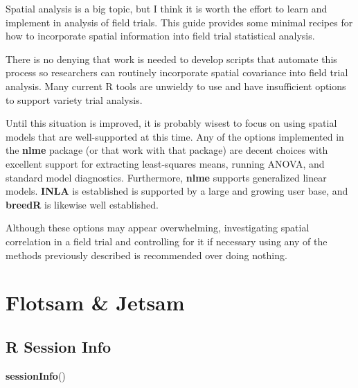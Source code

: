 \documentclass[
]{book}
\newenvironment{Shaded}{\begin{snugshade}}{\end{snugshade}}
\newcommand{\FunctionTok}[1]{\textcolor[rgb]{0.13,0.29,0.53}{\textbf{#1}}}
\newcommand{\NormalTok}[1]{#1}
\begin{document}
Spatial analysis is a big topic, but I think it is worth the effort to learn and implement in analysis of field trials. This guide provides some minimal recipes for how to incorporate spatial information into field trial statistical analysis.

There is no denying that work is needed to develop scripts that automate this process so researchers can routinely incorporate spatial covariance into field trial analysis. Many current R tools are unwieldy to use and have insufficient options to support variety trial analysis.

Until this situation is improved, it is probably wisest to focus on using spatial models that are well-supported at this time. Any of the options implemented in the \textbf{nlme} package (or that work with that package) are decent choices with excellent support for extracting least-squares means, running ANOVA, and standard model diagnostics. Furthermore, \textbf{nlme} supports generalized linear models. \textbf{INLA} is established is supported by a large and growing user base, and \textbf{breedR} is likewise well established.

Although these options may appear overwhelming, investigating spatial correlation in a field trial and controlling for it if necessary using any of the methods previously described is recommended over doing nothing.

\hypertarget{flotsam-jetsam}{%
\chapter{Flotsam \& Jetsam}\label{flotsam-jetsam}}

\hypertarget{r-session-info}{%
\section{R Session Info}\label{r-session-info}}

\begin{Shaded}
\begin{Highlighting}[]
\FunctionTok{sessionInfo}\NormalTok{()}
\end{Highlighting}
\end{Shaded}
\end{document}
